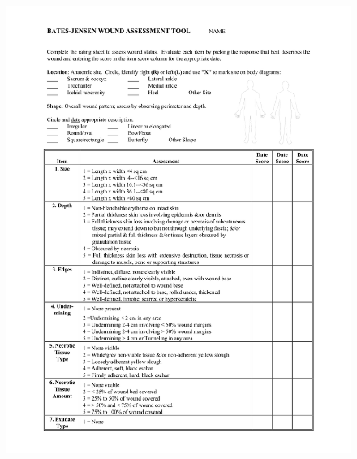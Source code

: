 \begin{figure}[H]
	\centering
	\includegraphics[keepaspectratio, width=14cm]{gambar/BWAT-3}
	\label{gambar:bwat_3}
\end{figure}

